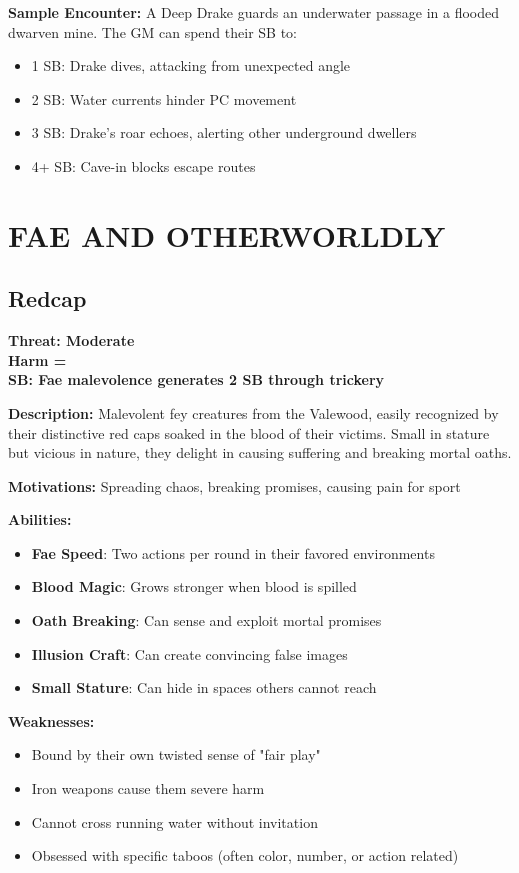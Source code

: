 \documentclass[12pt]{article}
\newcommand{\cp}[1]{\textbf{SB: #1}}
\newcommand{\harm}[1]{\textbf{Harm #1}}
\newcommand{\threat}[1]{\textbf{Threat: #1}}
\begin{document}
\textbf{Sample Encounter:}
A Deep Drake guards an underwater passage in a flooded dwarven mine. The GM can spend their SB to:
\begin{itemize}
\item 1 SB: Drake dives, attacking from unexpected angle
\item 2 SB: Water currents hinder PC movement
\item 3 SB: Drake's roar echoes, alerting other underground dwellers
\item 4+ SB: Cave-in blocks escape routes
\end{itemize}

\section{FAE AND OTHERWORLDLY}

\subsection*{Redcap}

\threat{Moderate} \\
\harm{=} \\
\cp{Fae malevolence generates 2 SB through trickery}

\vspace{0.5em}
\textbf{Description:} Malevolent fey creatures from the Valewood, easily recognized by their distinctive red caps soaked in the blood of their victims. Small in stature but vicious in nature, they delight in causing suffering and breaking mortal oaths.

\textbf{Motivations:} Spreading chaos, breaking promises, causing pain for sport

\textbf{Abilities:}
\begin{itemize}
\item \textbf{Fae Speed}: Two actions per round in their favored environments
\item \textbf{Blood Magic}: Grows stronger when blood is spilled
\item \textbf{Oath Breaking}: Can sense and exploit mortal promises
\item \textbf{Illusion Craft}: Can create convincing false images
\item \textbf{Small Stature}: Can hide in spaces others cannot reach
\end{itemize}

\textbf{Weaknesses:}
\begin{itemize}
\item Bound by their own twisted sense of "fair play"
\item Iron weapons cause them severe harm
\item Cannot cross running water without invitation
\item Obsessed with specific taboos (often color, number, or action related)
\end{itemize}
\end{document}
